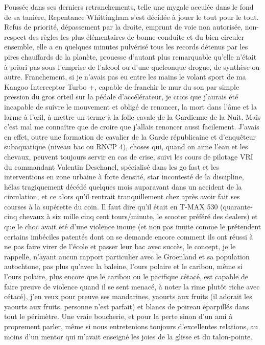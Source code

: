 Poussée dans ses derniers retranchements, telle une mygale acculée dans le fond de sa tanière, Repentance Whittingham s’est décidée à jouer le tout pour le tout. Refus de priorité, dépassement par la droite, emprunt de voie non autorisée, non-respect des règles les plus élémentaires de bonne conduite et du bien circuler ensemble, elle a en quelques minutes pulvérisé tous les records détenus par les pires chauffards de la planète, prouesse d’autant plus remarquable qu’elle n’était à priori pas sous l’emprise de l’alcool ou d’une quelconque drogue, de synthèse ou autre. Franchement, si je n’avais pas eu entre les mains le volant sport de ma Kangoo Interceptor Turbo +, capable de franchir le mur du son par simple pression du gros orteil sur la pédale d’accélérateur, je crois que j’aurais été incapable de suivre le mouvement et obligé de renoncer, la mort dans l’âme et la larme à l’œil, à mettre un terme à la folle cavale de la Gardienne de la Nuit. Mais c’est mal me connaître que de croire que j’allais renoncer aussi facilement. J’avais en effet, outre une formation de cavalier de la Garde républicaine et d’enquêteur subaquatique (niveau bac ou RNCP 4), choses qui, quand on aime l’eau et les chevaux, peuvent toujours servir en cas de crise, suivi les cours de pilotage VRI du commandant Valentin Deschanel, spécialisé dans les go fast et les interventions en zone urbaine à forte densité, star incontesté de la discipline, hélas tragiquement décédé quelques mois auparavant dans un accident de la circulation, et ce alors qu’il rentrait tranquillement chez après avoir fait ses courses à la supérette du coin. Il faut dire qu’il était en T-MAX 530 (quarante-cinq chevaux à six mille cinq cent tours/minute, le scooter préféré des dealers) et que le choc avait été d’une violence inouïe (et non pas inuite comme le prétendent certains imbéciles patentés dont on se demande encore comment ils ont réussi à ne pas faire virer de l’école et passer leur bac avec succès, le concept, je le rappelle, n’ayant aucun rapport particulier avec le Groenland et sa population autochtone, pas plus qu’avec la baleine, l’ours polaire et le caribou, même si l’ours polaire, plus encore que le caribou ou le pacifique cétacé, est capable de faire preuve de violence quand il se sent menacé, à noter la rime plutôt riche avec cétacé), j’en veux pour preuve ses mandarines, yaourts aux fruits (il adorait les yaourts aux fruits, personne n’est parfait) et blancs de poireau éparpillés dans tout le périmètre. Une vraie boucherie, et pour la perte sinon d’un ami à proprement parler, même si nous entretenions toujours d’excellentes relations, au moins d’un mentor qui m’avait enseigné les joies de la glisse et du talon-pointe.

